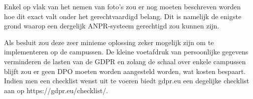 Enkel op vlak van het nemen van foto's zou er nog moeten beschreven worden hoe dit exact valt onder het gerechtvaardigd belang. Dit is namelijk de enigste grond waarop een dergelijk ANPR-systeem gerechtigd zou kunnen zijn.

Als besluit zou deze zeer minieme oplossing zeker mogelijk zijn om te implementeren op de campussen. De kleine voetafdruk van persoonlijke gegevens verminderen de lasten van de GDPR en zolang de schaal over enkele campussen blijft zou er geen DPO moeten worden aangesteld worden, wat kosten bespaart. Indien men een checklist wenst uit te voeren biedt gdpr.eu een degelijke checklist aan op https://gdpr.eu/checklist/.





